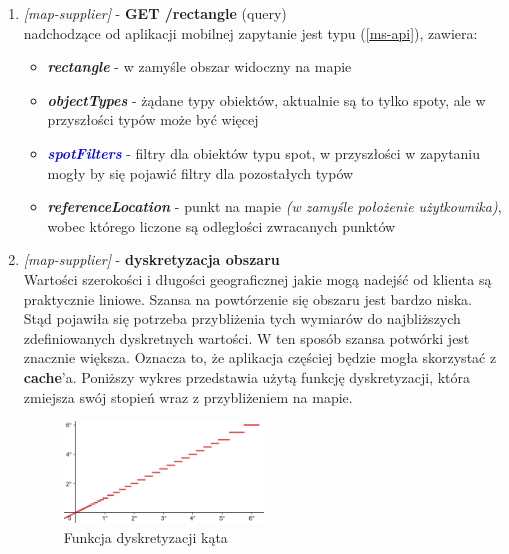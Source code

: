 \begin{enumerate}
    \item
    \large{\emph{[map-supplier]} - \textbf{GET /rectangle} (query)}\normalsize\\
    nadchodzące od aplikacji mobilnej zapytanie jest typu  (\ref{ms-api}), zawiera:
    \begin{itemize}
        \item
        \textbf{\emph{rectangle}} - w zamyśle obszar widoczny na mapie

        \item
        \textbf{\emph{objectTypes}} - żądane typy obiektów, aktualnie są to tylko spoty, ale w przyszłości typów może być więcej

        \item
        \textbf{\textcolor{blue}{\emph{spotFilters}}} - filtry dla obiektów typu spot, w przyszłości w zapytaniu mogły by się pojawić filtry dla pozostałych typów

        \item
        \textbf{\emph{referenceLocation}} - punkt na mapie \emph{(w zamyśle położenie użytkownika)}, wobec którego liczone są odległości zwracanych punktów
    \end{itemize} 


    \item
    \large\emph{[map-supplier]} - \textbf{dyskretyzacja obszaru}\normalsize\\
    Wartości szerokości i długości geograficznej jakie mogą nadejść od klienta są praktycznie liniowe.
    Szansa na powtórzenie się obszaru jest bardzo niska. Stąd pojawiła się potrzeba przybliżenia tych wymiarów do najbliższych zdefiniowanych dyskretnych wartości.
    W ten sposób szansa potwórki jest znacznie większa. Oznacza to, że aplikacja częściej będzie mogła skorzystać z \textbf{cache}'a.
    Poniższy wykres przedstawia użytą funkcję dyskretyzacji, która zmiejsza swój stopień wraz z przybliżeniem na mapie.

    \begin{figure}[H]
        \begin{center}
            \includegraphics[width=0.5\textwidth]{img/lat-long-discretization}
        \end{center}
        \caption{Funkcja dyskretyzacji kąta}
    \end{figure}


\end{enumerate}
